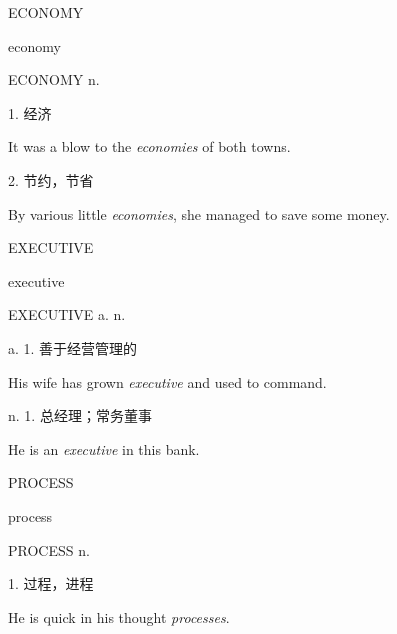 \begin{flashcard}{
ECONOMY

economy
}
\begin{center}
ECONOMY n. 
\end{center}
1. 经济

It was a blow to the \textit{economies} of both towns.

2. 节约，节省

By various little \textit{economies}, she managed to save some money.

\end{flashcard}
\begin{flashcard}{
EXECUTIVE

executive
}
\begin{center}
EXECUTIVE a. n. 
\end{center}
a. 1. 善于经营管理的

His wife has grown \textit{executive} and used to command.

n. 1. 总经理；常务董事

He is an \textit{executive} in this bank.

\end{flashcard}
\begin{flashcard}{
PROCESS

process
}
\begin{center}
PROCESS n. 
\end{center}
1. 过程，进程

He is quick in his thought \textit{processes}.

\end{flashcard}
